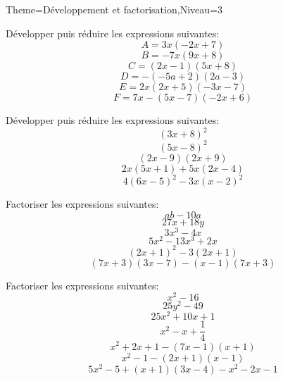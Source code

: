 \documentclass[a4paper,12pt]{article}
\begin{document}
\begin{Maquette}[Fiche]{Theme=Développement et factorisation,Niveau=3}

\begin{exercice}
Développer puis réduire les expressions suivantes:
$$A=3x\left(-2x+7\right)$$
$$B=-7x\left(9x+8\right) $$
$$C=\left(2x-1\right)\left(5x+8\right) $$
$$D=-\left(-5a+2\right)\left(2a-3\right) $$
$$E=2x\left(2x+5\right)\left(-3x-7\right)$$
$$F=7x-\left(5x-7\right)\left(-2x+6\right)$$
\end{exercice}

\begin{exercice}
Développer puis réduire les expressions suivantes:
$$\left(3x+8\right)^{2} $$
$$ \left(5x-8\right)^{2}$$
$$\left(2x-9\right)\left(2x+9\right) $$
$$2x\left(5x+1\right)+5x\left(2x-4\right) $$
$$4\left(6x-5\right)^{2}-3x\left(x-2\right)^{2} $$

\end{exercice}

\begin{exercice}
Factoriser les expressions suivantes:
$$ab-10a $$
$$27x+18y $$
$$3x^{3}-4x $$
$$5x^{2}-13x^{3}+2x $$
$$ \left(2x+1\right)^{2}-3\left(2x+1\right)$$
$$\left(7x+3\right)\left(3x-7\right)-\left(x-1\right)
\left(7x+3\right) $$
\end{exercice}

\begin{exercice}
Factoriser les expressions suivantes:
$$ x^{2}-16$$
$$25y^{2}-49 $$
$$25x^{2}+10x+1 $$
$$x^{2}-x+\dfrac{1}{4} $$
$$x^{2}+2x+1-\left(7x-1\right)\left(x+1\right) $$
$$x^{2}-1-\left(2x+1\right)\left(x-1\right) $$
$$5x^{2}-5+\left(x+1\right)\left(3x-4\right)-x^{2}-2x-1 $$
\end{exercice}
\end{Maquette}
\end{document}
